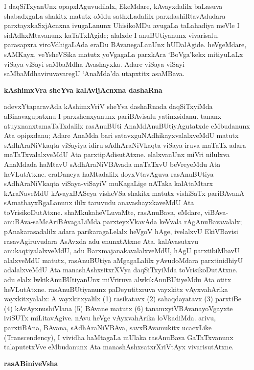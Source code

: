 I daqSiTxyanUnx opapxlAguvudilalx, EkeMdare, kAvayxdalilx baLasuva shabadxgaLa shakitx matutx oMdu sathxLadalilx parxdashiRtavAdudara parxtayxkaSxjAcnxna ivugaLanunx UhisikoMDu avugaLa taLahadiya meVle I sidAdhxMtavanunx kaTaTxlAgide; alalxde I anuBUtiyanunx vivarisalu. parasapxra viroVdhigaLAda eraDu BAvanegaLanUnx hUDalAgide. heVgeMdare, sAMKayx, veYsheVSika matutx yoVgagaLa parxkAra `BoVga'kekx mitiyuLaLx viSaya-viSayi saMbaMdha Avashayxka. Adare viSaya-viSayi saMbaMdhaviruvavaregU `AnaMda'da utapxtitx asaMBava.

\bigskip
\begin{center}
{\Large\bf kAshimxVra sheYva kalAvijAcnxna dashaRna}
\end{center}

adevxYtaparavAda kAshimxVriV sheYva dashaRnada daqSiTxyiMda aBinavagupatxnu I parxshenx\-yanunx pariBAvisalu yatinxsidanu. tananx atuyxnanxtamaTaTxdalilx rasAnuBUti AnaMdAnu\-BUtiyAgutatxde eMbudanunx Ata opipxdanu; Adare AnaMda bari satavxguNAdhikayxvalalx\-veMdU matutx sAdhAraNiVkaqta viSayiya idiru sAdhAraNiVkaqta viSaya iruva maTaTx adara maTaTxvalalxveMdU Ata parxtipAdisutAtxne. elalxvanUnx miVri nilulxva AnaMdada haMtavU sAdhAraNiVBAvada maTaTxvU beVreyeMdu Ata heVLutAtxne. eraDaneya haMta\-dalilx doyxVtavAguva rasAnuBUtiya sAdhAraNiVkaqta viSaya-viSayiV muKagaLige nATaka kalAtaMtarx kAraNaveMdU kAvayxBASeya visheVSa shakitx matutx vishiSaTx pariBAvanA sAmathayxRgaLanunx ililx taruvudu anavashayxkaveMdU Ata toVrisikoDutAtxne. shaMkuka\break heVLuvaMte, rasAnuBava, eMdare, viBAva-anuBAva-saMcAriBAvagaLiMda parxteyxVka\-vAda keVvala rAgAnuBavavalalx; pAnakarasadalilx adara parikaragaLelalx heVgoV hAge, ivelalxvU EkiVBavisi rasavAgiruvudara AsAvxda adu enunxtAtxne Ata. kalAvasutxvu anukaqtiyalalxveMdU, adu BarxmajanakavalalxveMdU, hAgU parxtibiMbavU alalxveMdU matutx, rasAnuBUtiya aMgagaLalilx yAvudoMdara parxtinidhiyU adalalxveMdU Ata manashAshxsitxrXVya daqSiTxyiMda toVrisikoDutAtxne. adu elalx lwkikAnuBUtiyanUnx miVriruva alwkikAnuBUtiyeMdu Ata otitx heVLutAtxne. rasAnuBUtiyanunx paDeyutitxruva vayxkitx vAyxvahArika vayxkitxyalalx: A vayxkitxyalilx (1) rasikatavx (2) sahaqdayatavx (3) parxtiBe (4) kAvAyxnushiVlana (5) BAvane matutx (6) tanamxyiVBAvanayoVgayxte iviSUTx miLitavAgive. nAvu heVge vAyxvahArika loVkadiMda. arivu, parxtiBAna, BAvana, sAdhAraNiVBAva, savxBAvamukitx ucacxLike {\rm(Transcendency)}, I vividha haMtagaLa mUlaka rasAnuBava GaTaTxvanunx talaputetxVve eMbudanunx Ata manashAshxsatxrXriVtAyx vivarisutAtxne.

\bigskip
\begin{center}
{\Large\bf rasABiniveVsha}
\end{center}

